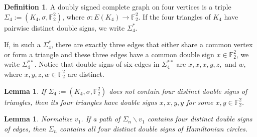\documentclass[12pt]{amsart}
\theoremstyle{plain}
\newtheorem{lemma}[theorem]{Lemma}
\theoremstyle{definition}%
\newtheorem{definition}{Definition}
\begin{document}
\begin{definition}\label{def:sigma4-tri-distinct}
A doubly signed complete graph on four vertices is a triple
\(\Sigma_4 := (K_4,\sigma,\mathbb{F}_2^2)\), where
\(\sigma : E(K_4) \to \mathbb{F}_2^2\).
If the four triangles of \(K_4\) have pairwise distinct double signs, we write
\(\Sigma_4^*\).

If, in such a \(\Sigma_4^*\), there are exactly three edges that either share a
common vertex or form a triangle and these three edges have a common double sign
\(x \in \mathbb{F}_2^2\), we write \(\Sigma_4^{**}\). Notice that double signs of six edges in \(\Sigma_4^{**}\) are $x,x,x,y,z,$ and $w$, where $x,y,z, w\in \mathbb{F}_2^2$ are distinct.
\end{definition}





\begin{lemma}\label{lemma14}
    If $\Sigma_4:=(K_4,\sigma,\mathbb{F}_2^2)$ does not contain four distinct double signs of triangles, then its four triangles have double signs $x,x,y,y$ for some $x,y\in\mathbb{F}_2^2$.
\end{lemma}

\begin{lemma}\label{lemma15}
   Normalize $v_1$. If a path of $\Sigma_n\backslash v_1$ contains four distinct double signs of edges, then  $\Sigma_n$ contains all four distinct double signs of Hamiltonian circles.
\end{lemma}
\end{document}
